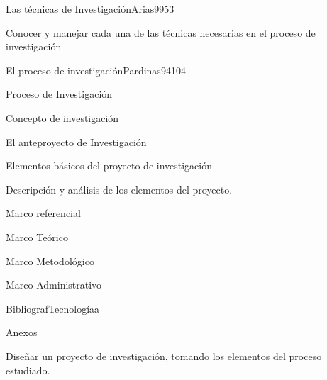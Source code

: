 \begin{syllabus}
\begin{unit}{Las técnicas de Investigación}{Arias99}{5}{3}
   \begin{unitgoals}
      \item Conocer y manejar cada una de las técnicas necesarias en el proceso de investigación
   \end{unitgoals}
\end{unit}

\begin{unit}{El proceso de investigación}{Pardinas94}{10}{4}
   \begin{topics}
      \item Proceso de Investigación
	\item Concepto de investigación
	\item El anteproyecto de Investigación 
	\item Elementos básicos del proyecto de investigación
	\item Descripción y análisis de los elementos del proyecto.
	\item Marco referencial
	\item Marco Teórico
	\item Marco Metodológico
	\item Marco Administrativo
	\item BibliografTecnologíaa 
	\item Anexos
   \end{topics}

   \begin{unitgoals}
      \item Diseñar un proyecto de investigación, tomando los elementos del proceso estudiado.
   \end{unitgoals}
\end{unit}

\begin{coursebibliography}
\end{coursebibliography}
\end{syllabus}
